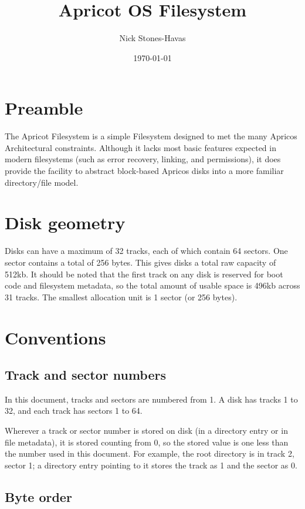 \documentclass{article}
\title{Apricot OS Filesystem}
\author{Nick Stones-Havas}
\date{\today}
\begin{document}
\maketitle
\thispagestyle{fancy}
\section{Preamble}
The Apricot Filesystem is a simple Filesystem designed to met the many Apricos Architectural constraints. Although it lacks most basic features expected in modern filesystems (such as error recovery, linking, and permissions), it does provide the facility to abstract block-based Apricos disks into a
more familiar directory/file model.

\section{Disk geometry}

Disks can have a maximum of 32 tracks, each of which contain 64 sectors. One sector contains a total of 256 bytes.
This gives disks a total raw capacity of 512kb. It should be noted that the first track on any disk is reserved for boot code
and filesystem metadata, so the total amount of usable space is 496kb across 31 tracks.
The smallest allocation unit is 1 sector (or 256 bytes).

\section{Conventions}

\subsection{Track and sector numbers}

In this document, tracks and sectors are numbered from 1. A disk has tracks 1 to 32, and each track has sectors 1 to 64.

Wherever a track or sector number is stored on disk (in a directory entry or in file metadata), it is stored counting from 0,
so the stored value is one less than the number used in this document. For example, the root directory is in track 2, sector 1;
a directory entry pointing to it stores the track as 1 and the sector as 0.

\subsection{Byte order}
\end{document}
